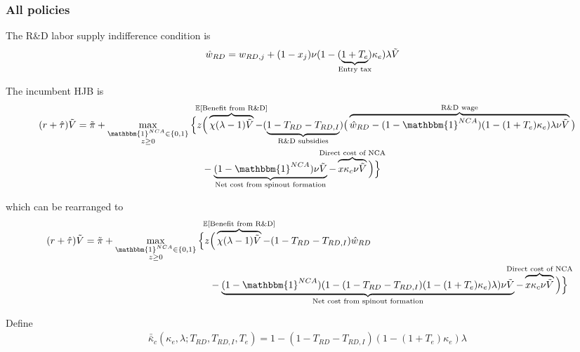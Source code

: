 \documentclass[11pt,english]{article}
\begin{document}
\subsubsection{All policies}\label{appendix:model:efficiencyderivations:allPolicies}

The R\&D labor supply indifference condition is
\begin{align}
\hat{w}_{RD} &= w_{RD,j} + (1-x_j) \nu (1-(\underbrace{1+T_e}_{\mathclap{\text{Entry tax}}})\kappa_e) \lambda \tilde{V} \label{eq:RD_worker_indifference_all}
\end{align}

The incumbent HJB is
\begin{align}
(r + \hat{\tau}) \tilde{V} = \tilde{\pi} + \max_{\substack{\mathbbm{1}^{NCA} \in \{0,1\} \\ z \ge 0}} \Big\{z &\Big( \overbrace{\chi (\lambda - 1) \tilde{V}}^{\mathclap{\mathbb{E}[\textrm{Benefit from R\&D}]}}-  (\underbrace{1 - T_{RD} - T_{RD,I}}_{\mathclap{\text{R\&D subsidies}}})\big( \overbrace{\hat{w}_{RD} - (1-\mathbbm{1}^{NCA})(1-(1+T_e)\kappa_e)\lambda \nu \tilde{V}}^{\mathclap{\text{R\&D wage}}}\big) \label{eq:hjb_incumbent_all} \nonumber \\ 
&-  \underbrace{(1-\mathbbm{1}^{NCA}) \nu \tilde{V}}_{\mathclap{\text{Net cost from spinout formation}}} - \overbrace{x \kappa_{c} \nu \tilde{V}}^{\mathclap{\text{Direct cost of NCA}}}\Big) \Big\} 
\end{align}

which can be rearranged to
\begin{align}
(r + \hat{\tau}) \tilde{V} = \tilde{\pi} + \max_{\substack{\mathbbm{1}^{NCA} \in \{0,1\} \\ z \ge 0}} \Big\{z &\Big( \overbrace{\chi (\lambda - 1) \tilde{V}}^{\mathclap{\mathbb{E}[\textrm{Benefit from R\&D}]}}- (1-T_{RD}- T_{RD,I})\hat{w}_{RD} \\
&-  \underbrace{(1-\mathbbm{1}^{NCA})(1 - (1-T_{RD} - T_{RD,I})(1-(1+T_e)\kappa_{e})\lambda)\nu \tilde{V}}_{\mathclap{\text{Net cost from spinout formation}}} - \overbrace{x \kappa_{c}\nu \tilde{V}}^{\mathclap{\text{Direct cost of NCA}}}\Big) \Big\} \label{eq:hjb_incumbent_all_2}
\end{align}

Define
\begin{align}
\bar{\bar{\kappa}}_c(\kappa_e,\lambda;T_{RD},T_{RD,I},T_e) = 1 - (1-T_{RD} - T_{RD,I})(1-(1+T_e)\kappa_e)\lambda  \label{eq:barkappa_all}
\end{align} 
\end{document}

